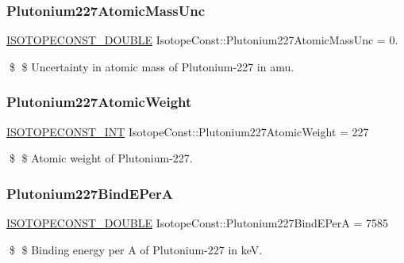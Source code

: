 \subsubsection{\texorpdfstring{Plutonium227\+Atomic\+Mass\+Unc}{Plutonium227AtomicMassUnc}}
{\footnotesize\ttfamily \mbox{\hyperlink{group___isotope_const-_macros_ga8f45a7272ce02c0b4c65c44636ed719a}{I\+S\+O\+T\+O\+P\+E\+C\+O\+N\+S\+T\+\_\+\+D\+O\+U\+B\+LE}} Isotope\+Const\+::\+Plutonium227\+Atomic\+Mass\+Unc = 0.}

\$ \$ Uncertainty in atomic mass of Plutonium-\/227 in amu. \mbox{\label{group___isotope_const-_plutonium-_pu227_gaafb830cde0220cd157e83ccc943cc792}} 
\subsubsection{\texorpdfstring{Plutonium227\+Atomic\+Weight}{Plutonium227AtomicWeight}}
{\footnotesize\ttfamily \mbox{\hyperlink{group___isotope_const-_macros_ga5f18360b3e99483a35c32d789e62621c}{I\+S\+O\+T\+O\+P\+E\+C\+O\+N\+S\+T\+\_\+\+I\+NT}} Isotope\+Const\+::\+Plutonium227\+Atomic\+Weight = 227}

\$ \$ Atomic weight of Plutonium-\/227. \mbox{\label{group___isotope_const-_plutonium-_pu227_gaf7604fcd60661aa73b2ee18d7ec5b25f}} 
\subsubsection{\texorpdfstring{Plutonium227\+Bind\+E\+PerA}{Plutonium227BindEPerA}}
{\footnotesize\ttfamily \mbox{\hyperlink{group___isotope_const-_macros_ga8f45a7272ce02c0b4c65c44636ed719a}{I\+S\+O\+T\+O\+P\+E\+C\+O\+N\+S\+T\+\_\+\+D\+O\+U\+B\+LE}} Isotope\+Const\+::\+Plutonium227\+Bind\+E\+PerA = 7585}

\$ \$ Binding energy per A of Plutonium-\/227 in keV. \mbox{\label{group___isotope_const-_plutonium-_pu227_gadaa3041cb537f5b09b1bfcd102164420}} 
